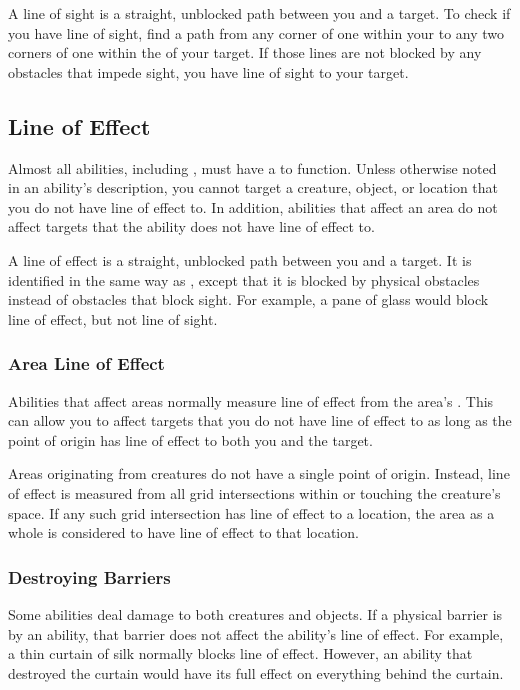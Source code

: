         A line of sight is a straight, unblocked path between you and a target.
        To check if you have line of sight, find a path from any corner of one  within your  to any two corners of one  within the  of your target.
        If those lines are not blocked by any obstacles that impede sight, you have line of sight to your target.

    \subsection{Line of Effect}\label{Line of Effect}

        Almost all abilities, including , must have a  to function.
        Unless otherwise noted in an ability's description, you cannot target a creature, object, or location that you do not have line of effect to.
        In addition, abilities that affect an area do not affect targets that the ability does not have line of effect to.

        A line of effect is a straight, unblocked path between you and a target.
        It is identified in the same way as , except that it is blocked by physical obstacles instead of obstacles that block sight.
        For example, a pane of glass would block line of effect, but not line of sight.

        \subsubsection{Area Line of Effect}\label{Area Line of Effect}
            Abilities that affect areas normally measure line of effect from the area's .
            This can allow you to affect targets that you do not have line of effect to as long as the point of origin has line of effect to both you and the target.

            Areas originating from creatures do not have a single point of origin.
            Instead, line of effect is measured from all grid intersections within or touching the creature's space.
            If any such grid intersection has line of effect to a location, the area as a whole is considered to have line of effect to that location.

        \subsubsection{Destroying Barriers}\label{Destroying Barriers}
            Some abilities deal damage to both creatures and objects.
            If a physical barrier is  by an ability, that barrier does not affect the ability's line of effect.
            For example, a thin curtain of silk normally blocks line of effect.
            However, an ability that destroyed the curtain would have its full effect on everything behind the curtain.

